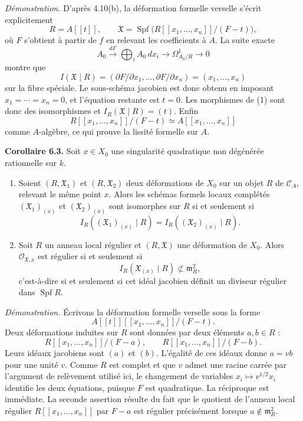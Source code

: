\documentclass[11pt]{article}
\providecommand{\Spf}{\operatorname{Spf}}
\providecommand{\Oo}{\mathcal O}
\begin{document}
\emph{Démonstration.}  D'après 4.10(b), la déformation formelle verselle s'écrit explicitement
\[
        R=A[[t]],\qquad
        \mathfrak X=
        \Spf\bigl(R[[x_1,\ldots,x_n]]/(F-t)\bigr),
\]
où \(F\) s'obtient à partir de \(f\) en relevant les coefficients à \(A\).  La suite exacte
\[
        A_0\xrightarrow{dF}
        \bigoplus_i A_0\,dx_i
        \longrightarrow
        \Omega^1_{A_0/R}
        \longrightarrow 0
\]
montre que
\[
        I(\mathfrak X\mid R)=(\partial F/\partial x_1,\ldots,\partial F/\partial x_n)
        =(x_1,\ldots,x_n)
\]
sur la fibre spéciale.  Le sous-schéma jacobien est donc obtenu en imposant \(x_1=\cdots=x_n=0\), et l'équation restante est \(t=0\).  Les morphismes de (1) sont donc des isomorphismes et \(I_R(\mathfrak X\mid R)=(t)\).  Enfin
\[
        R[[x_1,\ldots,x_n]]/(F-t)
        \simeq
        A[[x_1,\ldots,x_n]]
\]
comme \(A\)-algèbre, ce qui prouve la lissité formelle sur \(A\).

\textbf{Corollaire 6.3.}  Soit \(x\in X_0\) une singularité quadratique non dégénérée rationnelle sur \(k\).
\begin{enumerate}[label=(\arabic*)]
\item Soient \((R,\mathfrak X_1)\) et \((R,\mathfrak X_2)\) deux déformations de \(X_0\) sur un objet \(R\) de \(\mathcal C_A\), relevant le même point \(x\).  Alors les schémas formels locaux complétés \((\mathfrak X_1)_{(x)}\) et \((\mathfrak X_2)_{(x)}\) sont isomorphes sur \(R\) si et seulement si
\[
        I_R((\mathfrak X_1)_{(x)}\mid R)
        =
        I_R((\mathfrak X_2)_{(x)}\mid R).
\]
\item Soit \(R\) un anneau local régulier et \((R,\mathfrak X)\) une déformation de \(X_0\).  Alors \(\Oo_{\mathfrak X,x}\) est régulier si et seulement si
\[
        I_R(\mathfrak X_{(x)}\mid R)\not\subset \mathfrak m_R^2,
\]
c'est-à-dire si et seulement si cet idéal jacobien définit un diviseur régulier dans \(\Spf R\).
\end{enumerate}

\emph{Démonstration.}  Écrivons la déformation formelle verselle sous la forme
\[
        A[[t]][[x_1,\ldots,x_n]]/(F-t).
\]
Deux déformations induites sur \(R\) sont données par deux éléments \(a,b\in R\) :
\[
        R[[x_1,\ldots,x_n]]/(F-a),
        \qquad
        R[[x_1,\ldots,x_n]]/(F-b).
\]
Leurs idéaux jacobiens sont \((a)\) et \((b)\).  L'égalité de ces idéaux donne \(a=vb\) pour une unité \(v\).  Comme \(R\) est complet et que \(v\) admet une racine carrée par l'argument de relèvement utilisé ici, le changement de variables \(x_i\mapsto v^{1/2}x_i\) identifie les deux équations, puisque \(F\) est quadratique.  La réciproque est immédiate.  La seconde assertion résulte du fait que le quotient de l'anneau local régulier \(R[[x_1,\ldots,x_n]]\) par \(F-a\) est régulier précisément lorsque \(a\notin\mathfrak m_R^2\).
\end{document}
